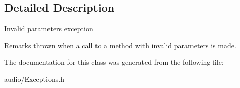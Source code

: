 \subsection{Detailed Description}
Invalid parameters exception \begin{DoxyRemark}{Remarks}
thrown when a call to a method with invalid parameters is made. 
\end{DoxyRemark}


The documentation for this class was generated from the following file\+:\begin{DoxyCompactItemize}
\item 
audio/Exceptions.\+h\end{DoxyCompactItemize}
